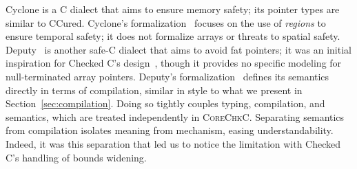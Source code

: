 \documentclass[conference]{IEEEtran}
\newcommand{\lang}{\textsc{CoreChkC}\xspace}
\begin{document}
Cyclone \cite{Jim2002,GrossmanMJHWC02} is a C dialect that aims to
ensure memory safety; its pointer types are similar to
CCured. Cyclone's formalization~\cite{GrossmanMJHWC02} focuses on the
use of \emph{regions} to ensure temporal safety; it does not formalize
arrays or threats to spatial safety. Deputy~\cite{Feng2006,Condit2007}
is another safe-C dialect that aims to avoid fat pointers; it was an
initial inspiration for Checked C's design~\cite{Elliott2018}, though
it provides no specific modeling for null-terminated array
pointers. Deputy's formalization~\cite{Condit2007} defines its
semantics directly in terms of compilation, similar in style to what
we present in Section~\ref{sec:compilation}. Doing so tightly couples
typing, compilation, and semantics, which are treated independently in
\lang. Separating semantics from compilation isolates meaning 
from mechanism, easing understandability. Indeed, it was this
separation that led us to notice the 
limitation with Checked C's handling of bounds widening.
\end{document}

